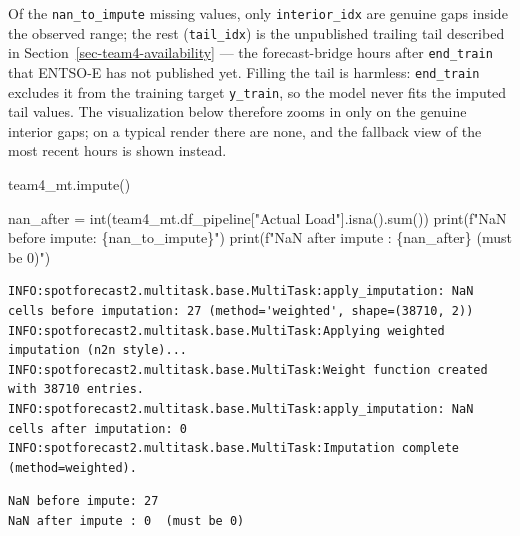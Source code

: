 \documentclass[
  english,
  letterpaper,
]{scrbook}
\newenvironment{Shaded}{\begin{snugshade}}{\end{snugshade}}
\newcommand{\BuiltInTok}[1]{\textcolor[rgb]{0.00,0.23,0.31}{#1}}
\newcommand{\NormalTok}[1]{\textcolor[rgb]{0.00,0.23,0.31}{#1}}
\newcommand{\OperatorTok}[1]{\textcolor[rgb]{0.37,0.37,0.37}{#1}}
\newcommand{\SpecialCharTok}[1]{\textcolor[rgb]{0.37,0.37,0.37}{#1}}
\newcommand{\SpecialStringTok}[1]{\textcolor[rgb]{0.13,0.47,0.30}{#1}}
\newcommand{\StringTok}[1]{\textcolor[rgb]{0.13,0.47,0.30}{#1}}
\newcounter{none} %
\begin{document}
Of the \texttt{nan\_to\_impute} missing values, only
\texttt{interior\_idx} are genuine gaps inside the observed range; the
rest (\texttt{tail\_idx}) is the unpublished trailing tail described in
Section~\ref{sec-team4-availability} --- the forecast-bridge hours after
\texttt{end\_train} that ENTSO-E has not published yet. Filling the tail
is harmless: \texttt{end\_train} excludes it from the training target
\texttt{y\_train}, so the model never fits the imputed tail values. The
visualization below therefore zooms in only on the genuine interior
gaps; on a typical render there are none, and the fallback view of the
most recent hours is shown instead.

\protect{}\label{team4-impute}
\begin{Shaded}
\begin{Highlighting}[]
\NormalTok{team4\_mt.impute()}

\NormalTok{nan\_after }\OperatorTok{=} \BuiltInTok{int}\NormalTok{(team4\_mt.df\_pipeline[}\StringTok{"Actual Load"}\NormalTok{].isna().}\BuiltInTok{sum}\NormalTok{())}
\BuiltInTok{print}\NormalTok{(}\SpecialStringTok{f"NaN before impute: }\SpecialCharTok{\{}\NormalTok{nan\_to\_impute}\SpecialCharTok{\}}\SpecialStringTok{"}\NormalTok{)}
\BuiltInTok{print}\NormalTok{(}\SpecialStringTok{f"NaN after impute : }\SpecialCharTok{\{}\NormalTok{nan\_after}\SpecialCharTok{\}}\SpecialStringTok{  (must be 0)"}\NormalTok{)}
\end{Highlighting}
\end{Shaded}

\begin{verbatim}
INFO:spotforecast2.multitask.base.MultiTask:apply_imputation: NaN cells before imputation: 27 (method='weighted', shape=(38710, 2))
INFO:spotforecast2.multitask.base.MultiTask:Applying weighted imputation (n2n style)...
INFO:spotforecast2.multitask.base.MultiTask:Weight function created with 38710 entries.
INFO:spotforecast2.multitask.base.MultiTask:apply_imputation: NaN cells after imputation: 0
INFO:spotforecast2.multitask.base.MultiTask:Imputation complete (method=weighted).
\end{verbatim}

\begin{verbatim}
NaN before impute: 27
NaN after impute : 0  (must be 0)
\end{verbatim}
\end{document}
